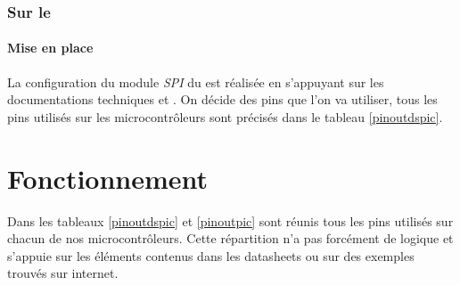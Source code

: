 			\subsubsection{Sur le \dspic}
			\paragraph{Mise en place}La configuration du module \textit{SPI} du \dspic est réalisée en s'appuyant sur les documentations techniques \cite{DatasheetDSPIC} et \cite{DatasheetDSPIC30} . On décide des pins que l'on va utiliser, tous les pins utilisés sur les microcontrôleurs sont précisés dans le tableau \ref{pinoutdspic}.
			
		\section{Fonctionnement}
		Dans les tableaux \ref{pinoutdspic} et \ref{pinoutpic} sont réunis tous les pins utilisés sur chacun de nos microcontrôleurs. Cette répartition n'a pas forcément de logique et s'appuie sur les éléments contenus dans les datasheets ou sur des exemples trouvés sur internet.\\
